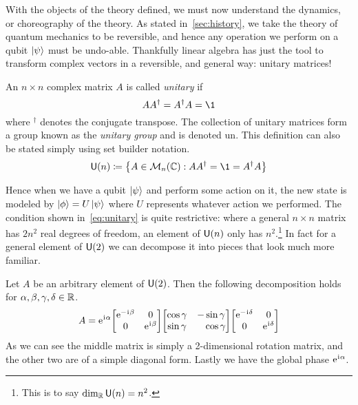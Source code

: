 With the objects of the theory defined, we must now understand the dynamics, or choreography of the theory.
As stated in~\cref{sec:history}, we take the theory of quantum mechanics to be reversible, and hence any operation we perform on a qubit $\ket{\psi}$ must be undo-able.
Thankfully linear algebra has just the tool to transform complex vectors in a reversible, and general way: unitary matrices!
\begin{definition}
    An $n\times n$ complex matrix $A$ is called \emph{unitary} if
    \begin{equation}\label{eq:unitary}
        AA^\dagger = A^\dagger A = \1
    \end{equation}
    where $^\dagger$ denotes the conjugate transpose.
    The collection of unitary matrices form a group known as the \emph{unitary group} and is denoted \gls{un}.
    This definition can also be stated simply using set builder notation.
    \begin{equation}
        \U{n} \defeq \qty{ A \in \mats{n}{\C} : AA^\dagger = \1 = A^\dagger A} %
    \end{equation}
\end{definition}
Hence when we have a qubit $\ket{\psi}$ and perform some action on it, the new state is modeled by $\ket{\phi} = U\ket{\psi}$ where $U$ represents whatever action we performed.
The condition shown in~\cref{eq:unitary} is quite restrictive: where a general $n \times n$ matrix has $2n^2$ real degrees of freedom, an element of $\mathsf{U} (n)$ only has $n^2$.\footnote{This is to say $\dim_{\mathbb{R}}\mathsf{U} (n) = n^2$.}
In fact for a general element of $\mathsf{U} (2)$ we can decompose it into pieces that look much more familiar. %
\begin{example}
    Let $A$ be an arbitrary element of $\mathsf{U} (2)$.
    Then the following decomposition holds for $\alpha, \beta, \gamma, \delta \in \mathbb{R}$.
    \begin{equation}
        A = \e^{\iu\alpha}\mqty[\dmat[0]{\e^{-\iu \beta}, \e^{\iu \beta}}]\mqty[\cos\gamma & -\sin\gamma \\ \sin\gamma & \phantom{+}\cos\gamma]\mqty[\dmat[0]{\e^{-\iu \delta}, \e^{\iu \delta}}]
    \end{equation}
    As we can see the middle matrix is simply a 2-dimensional rotation matrix, and the other two are of a simple diagonal form.
    Lastly we have the global phase $\mathrm{e}^{\mkern1mu\mathrm{i}\mkern1mu \alpha}$.
\end{example}

